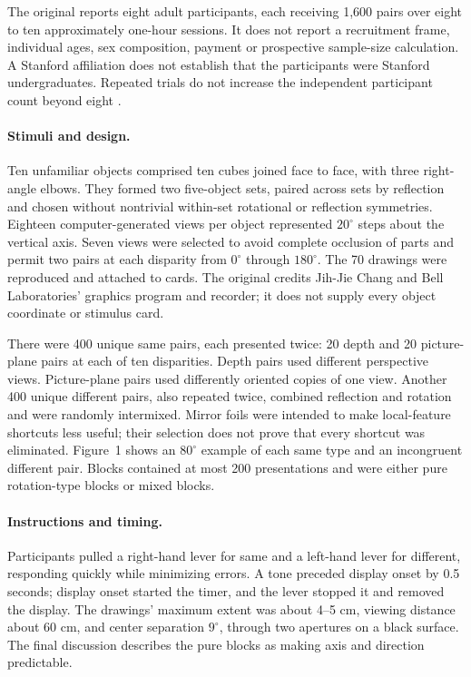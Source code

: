 The original reports eight adult participants, each receiving
1,600 pairs over eight to ten approximately one-hour sessions.
It does not report a recruitment frame, individual ages, sex
composition, payment or prospective sample-size calculation.
A Stanford affiliation does not establish that the participants
were Stanford undergraduates. Repeated trials do not increase
the independent participant count beyond eight
\cite[pp.~701--703]{ShepardMetzler1971MentalRotation}.

\paragraph{Stimuli and design.}
Ten unfamiliar objects comprised ten cubes joined face to face,
with three right-angle elbows. They formed two five-object sets,
paired across sets by reflection and chosen without nontrivial
within-set rotational or reflection symmetries.
Eighteen computer-generated views per object represented
\(20^\circ\) steps about the vertical axis. Seven views were
selected to avoid complete occlusion of parts and permit two
pairs at each disparity from \(0^\circ\) through \(180^\circ\).
The 70 drawings were reproduced and attached to cards.
The original credits Jih-Jie Chang and Bell Laboratories'
graphics program and recorder; it does not supply every object
coordinate or stimulus card.

There were 400 unique same pairs, each presented twice:
20 depth and 20 picture-plane pairs at each of ten disparities.
Depth pairs used different perspective views. Picture-plane
pairs used differently oriented copies of one view.
Another 400 unique different pairs, also repeated twice,
combined reflection and rotation and were randomly intermixed.
Mirror foils were intended to make local-feature shortcuts less
useful; their selection does not prove that every shortcut was
eliminated. Figure~1 shows an \(80^\circ\) example of each same
type and an incongruent different pair.
Blocks contained at most 200 presentations and were either
pure rotation-type blocks or mixed blocks.

\paragraph{Instructions and timing.}
Participants pulled a right-hand lever for same and a left-hand
lever for different, responding quickly while minimizing errors.
A tone preceded display onset by 0.5 seconds; display onset started
the timer, and the lever stopped it and removed the display.
The drawings' maximum extent was about 4--5 cm, viewing distance
about 60 cm, and center separation \(9^\circ\), through two
apertures on a black surface. The final discussion describes
the pure blocks as making axis and direction predictable.

